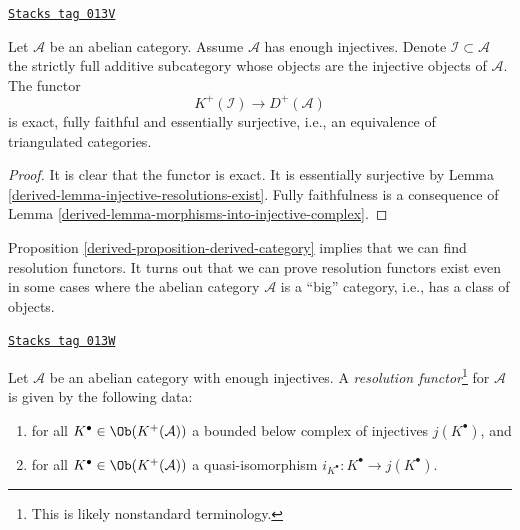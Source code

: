 \begin{proposition}
\label{derived-proposition-derived-category}
\href{https://stacks.math.columbia.edu/tag/013V}{\texttt{Stacks tag 013V}}

Let $\mathcal{A}$ be an abelian category.
Assume $\mathcal{A}$ has enough injectives.
Denote $\mathcal{I} \subset \mathcal{A}$ the strictly full
additive subcategory whose objects are the injective objects of
$\mathcal{A}$.
The functor
$$
K^{+}(\mathcal{I}) \longrightarrow D^{+}(\mathcal{A})
$$
is exact, fully faithful and essentially surjective, i.e.,
an equivalence of triangulated categories.
\end{proposition}

\begin{proof}

It is clear that the functor is exact.
It is essentially surjective by
Lemma \ref{derived-lemma-injective-resolutions-exist}.
Fully faithfulness is a consequence of
Lemma \ref{derived-lemma-morphisms-into-injective-complex}.
\end{proof}

Proposition \ref{derived-proposition-derived-category}
implies that we can find resolution functors.
It turns out that we can prove resolution functors exist
even in some cases where the abelian category $\mathcal{A}$ is
a ``big'' category, i.e., has a class of objects.

\begin{definition}
\label{derived-definition-localization-functor}
\href{https://stacks.math.columbia.edu/tag/013W}{\texttt{Stacks tag 013W}}

Let $\mathcal{A}$ be an abelian category with enough injectives.
A {\it resolution functor}\footnote{This is likely nonstandard terminology.}
for $\mathcal{A}$ is given by the following data:
\begin{enumerate}
\item for all $K^\bullet \in \Ob(K^{+}(\mathcal{A}))$ a
bounded below complex of injectives $j(K^\bullet)$, and
\item for all $K^\bullet \in \Ob(K^{+}(\mathcal{A}))$ a
quasi-isomorphism $i_{K^\bullet} : K^\bullet \to j(K^\bullet)$.
\end{enumerate}
\end{definition}

